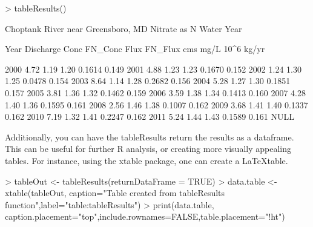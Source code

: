 \documentclass[a4paper,11pt]{article}
\begin{document}
\begin{Schunk}
\begin{Sinput}
> tableResults()
\end{Sinput}
\begin{Soutput}
   Choptank River near Greensboro, MD 
   Nitrate as N
   Water Year 

   Year   Discharge    Conc    FN_Conc     Flux    FN_Flux
             cms            mg/L             10^6 kg/yr 

   2000      4.72      1.19      1.20    0.1614     0.149
   2001      4.88      1.23      1.23    0.1670     0.152
   2002      1.24      1.30      1.25    0.0478     0.154
   2003      8.64      1.14      1.28    0.2682     0.156
   2004      5.28      1.27      1.30    0.1851     0.157
   2005      3.81      1.36      1.32    0.1462     0.159
   2006      3.59      1.38      1.34    0.1413     0.160
   2007      4.28      1.40      1.36    0.1595     0.161
   2008      2.56      1.46      1.38    0.1007     0.162
   2009      3.68      1.41      1.40    0.1337     0.162
   2010      7.19      1.32      1.41    0.2247     0.162
   2011      5.24      1.44      1.43    0.1589     0.161
NULL
\end{Soutput}
\end{Schunk}

\FloatBarrier

Additionally, you can have the tableResults return the results as a dataframe. This can be useful for further R analysis, or creating more visually appealing tables.  For instance, using the xtable package, one can create a \LaTeX table.

\begin{Schunk}
\begin{Sinput}
> tableOut <- tableResults(returnDataFrame = TRUE)
> data.table <- xtable(tableOut, caption="Table created from tableResults function",label="table:tableResults")
> print(data.table, caption.placement="top",include.rownames=FALSE,table.placement="!ht")
\end{Sinput}
\end{Schunk}
\end{document}
